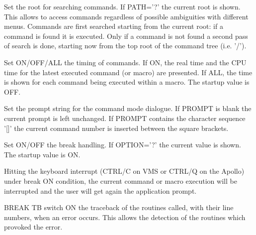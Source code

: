    \par
Set the root for searching commands.  If PATH='?' the current root is 
   shown.  This allows to access commands regardless of possible ambiguities 
   with different menus.  Commands are first searched starting from the 
   current root:  if a command is found it is executed.  Only if a command is 
   not found a second pass of search is done, starting now from the top root 
   of the command tree (i.e. '/').  

\ENDCMD


\BEGARG
{}
\ENDARG
{}
\ENDOPT

   \par
Set ON/OFF/ALL the timing of commands.  If ON, the real time and the CPU 
   time for the latest executed command (or macro) are presented.  If ALL, the 
   time is shown for each command being executed within a macro.  The startup 
   value is OFF.  

\ENDCMD


\BEGARG
{}
\ENDARG

   \par
Set the prompt string for the command mode dialogue.  If PROMPT is blank 
   the current prompt is left unchanged.  If PROMPT contains the character 
   sequence '[]' the current command number is inserted between the square 
   brackets.  

\ENDCMD


\BEGARG
{}
\ENDARG
{}
\ENDOPT

   \par
Set ON/OFF the break handling.  If OPTION='?' the current value is shown.  
   The startup value is ON.  

   \par
Hitting the keyboard interrupt (CTRL/C on VMS or CTRL/Q on the Apollo) 
   under break ON condition, the current command or macro execution will be 
   interrupted and the user will get again the application prompt.  

   \par
BREAK TB switch ON the traceback of the routines called, with their line 
   numbers, when an error occurs. This allows the detection of the routines 
   which provoked the error.  

